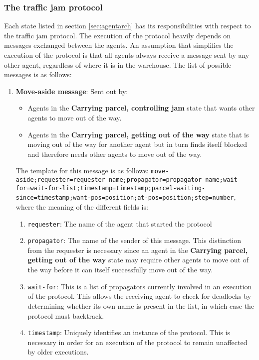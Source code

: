 \subsubsection{The traffic jam protocol}\label{sec:protocol}
Each state listed in section \ref{sec:agentarch} has its responsibilities with respect to the traffic jam protocol. The execution of the protocol heavily depends on messages exchanged between the agents. An assumption that simplifies the execution of the protocol is that all agents always receive a message sent by any other agent, regardless of where it is in the warehouse. The list of possible messages is as follows:
\begin{enumerate}
    \item \textbf{Move-aside message}: Sent out by:
        \begin{itemize}
            \item Agents in the \textbf{Carrying parcel, controlling jam} state that wants other agents to move out of the way.
            \item Agents in the \textbf{Carrying parcel, getting out of the way} state that is moving out of the way for another agent but in turn finds itself blocked and therefore needs other agents to move out of the way.
        \end{itemize}
    The template for this message is as follows: \texttt{move-aside;requester=requester-name;propagator=propagator-name;wait-for=wait-for-list;timestamp=timestamp;parcel-waiting-since=timestamp;want-pos=position;at-pos=position;step=number}, where the meaning of the different fields is:
        \begin{enumerate}
            \item \texttt{requester}: The name of the agent that started the protocol
            \item \texttt{propagator}: The name of the sender of this message. This distinction from the requester is necessary since an agent in the \textbf{Carrying parcel, getting out of the way} state may require other agents to move out of the way before it can itself successfully move out of the way.
            \item \texttt{wait-for}: This is a list of propagators currently involved in an execution of the protocol. This allows the receiving agent to check for deadlocks by determining whether its own name is present in the list, in which case the protocol must backtrack.
            \item \texttt{timestamp}: Uniquely identifies an instance of the protocol. This is necessary in order for an execution of the protocol to remain unaffected by older executions.

\end{enumerate}
\end{enumerate}
